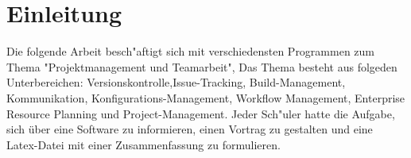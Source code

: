 \section{Einleitung}
Die folgende Arbeit besch"aftigt sich mit verschiedensten Programmen zum Thema "Projektmanagement und Teamarbeit",
Das Thema besteht aus folgeden Unterbereichen: Versionskontrolle,Issue-Tracking, Build-Management, Kommunikation, Konfigurations-Management, Workflow Management, Enterprise Resource Planning und Project-Management.
Jeder Sch"uler hatte die Aufgabe, sich über eine Software zu informieren, einen Vortrag zu gestalten und eine Latex-Datei mit einer Zusammenfassung zu formulieren. 
